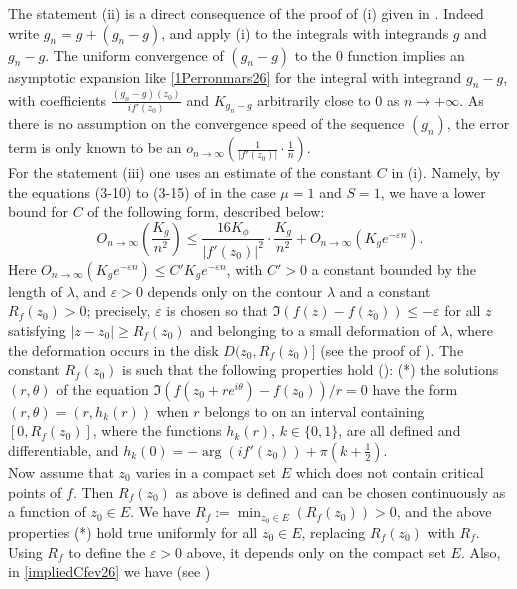\documentclass[11pt]{amsart}
\begin{document}
{ The statement (ii) is a direct consequence of the proof of (i) given in \cite{O'Sul}. Indeed write $g_n = g + (g_n-g)$, and apply (i) to the integrals with integrands $g$ and $g_n-g$. The uniform convergence of $(g_n-g)$ to the $0$ function implies an asymptotic expansion like \eqref{1Perronmars26} for the integral with integrand $g_n-g$, with coefficients $\textstyle \frac{(g_n-g)(z_0)}{i f'(z_0)} $ and $K_{g_n-g}$ arbitrarily close to $0$ as $n\to +\infty$. As there is no assumption on the convergence speed of the sequence $(g_n)$, the error term is only known to be an $\textstyle o_{n \to \infty}\left(\frac{1}{\vert f'(z_0)\vert}\cdot \frac{1}{n}\right)$.\\
For the statement (iii) one uses an estimate of the constant $C$ in (i). Namely, by the equations (3-10) to (3-15) of \cite{O'Sul} in the case $\mu=1$ and $S=1$, we have a lower bound for $C$ of the following form, described below:
\begin{equation}\label{impliedCfev26}
O_{n \to \infty}\left(\frac{K_g}{n^2}\right) \leq \frac{16K_\phi}{\vert f'(z_0)\vert^2}\cdot \frac{K_g}{n^2} +  O_{n \to \infty}\left(K_ge^{-\varepsilon n} \right).
\end{equation}
Here $O_{n \to \infty}\left(K_ge^{-\varepsilon n} \right)\leq C' K_ge^{-\varepsilon n}$, with $C'>0$ a constant bounded by the length of $\lambda$, and $\varepsilon>0$ depends only on the contour $\lambda$ and a constant $R_f(z_0)>0$; precisely, $\varepsilon$ is chosen so that $\mathfrak{I}(f(z)-f(z_0))\leq -\varepsilon$ for all $z$ satisfying $\vert z-z_0\vert \geq R_f(z_0)$ and belonging to a small deformation of $\lambda$, where the deformation occurs in the disk $D(z_0,R_f(z_0)]$ (see the proof of \cite[Proposition 1.3]{O'Sul}). The constant $R_f(z_0)$ is such that the following properties hold (\cite[Proposition 2.1]{O'Sul}): (*)  the solutions $(r,\theta)$ of the equation $\mathfrak{I}(f(z_0+re^{i\theta})-f(z_0))/r=0$ have the form $(r,\theta)=(r,h_k(r))$ when $r$ belongs to on an interval containing $[0, R_f(z_0)]$, where the functions $h_k(r)$, $k\in \{0,1\}$,  are all defined and differentiable, and $\textstyle h_k(0) = -\arg(if'(z_0))+\pi(k+\frac{1}{2})$.\\
Now assume that $z_0$ varies in a compact set $E$ which does not contain critical points of $f$. Then $R_f(z_0)$ as above is defined and can be chosen continuously as a function of $z_0\in E$. We have $\textstyle R_f:= \min_{z_0\in E} (R_f(z_0))>0$, and the above properties (*) hold true uniformly for all $z_0\in E$, replacing $R_f(z_0)$ with $R_f$. Using $R_f$ to define the $\varepsilon>0$ above,  it depends only on the compact set $E$. Also, in \eqref{impliedCfev26} we have (see \cite[equations (2-1) and (3-1)]{O'Sul})
}
\end{document}
